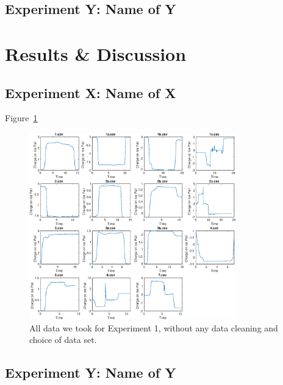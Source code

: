 \documentclass[11pt]{article}
\begin{document}
\subsection{Experiment Y: Name of Y    }


\section{Results \& Discussion}
\subsection{Experiment X: Name of X}

Figure~\ref{fig:exp1data}

\begin{figure}[H]
\centering
\includegraphics[width=0.8\textwidth]{figure1.eps}
\caption{All data we took for Experiment 1, without any data cleaning and choice of data set.}
\label{fig:exp1data}
\end{figure}



\subsection{Experiment Y: Name of Y} 
\end{document}
